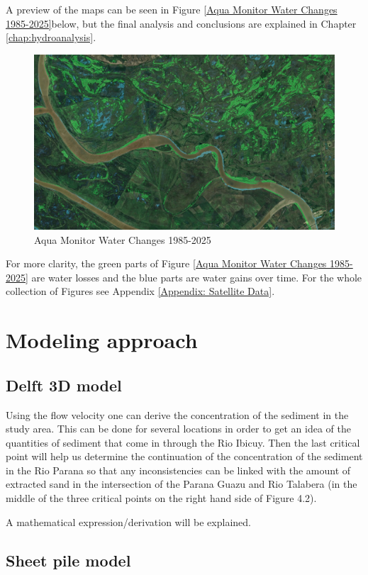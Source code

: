 A preview of the maps can be seen in Figure \ref{Aqua Monitor Water Changes 1985-2025}below, but the final analysis and conclusions are explained in Chapter \ref{chap:hydroanalysis}. 

\begin{figure}[H]
    \centering
    \includegraphics[width=0.75\linewidth]{figures/ch4/1985-2025.jpg}
    \caption{Aqua Monitor Water Changes 1985-2025}
\end{figure}
\label{Aqua Monitor Water Changes 1985-2025}

For more clarity, the green parts of Figure \ref{Aqua Monitor Water Changes 1985-2025} are water losses and the blue parts are water gains over time. For the whole collection of Figures see Appendix \ref{Appendix: Satellite Data}.

\section{Modeling approach}

\subsection{Delft 3D model}
Using the flow velocity one can derive the concentration of the sediment in the study area. This can be done for several locations in order to get an idea of the quantities of sediment that come in through the Rio Ibicuy. Then the last critical point will help us determine the continuation of the concentration of the sediment in the Rio Parana so that any inconsistencies can be linked with the amount of extracted sand in the intersection of the Parana Guazu and Rio Talabera (in the middle of the three critical points on the right hand side of Figure 4.2).

A mathematical expression/derivation will be explained.

\subsection{Sheet pile model}

